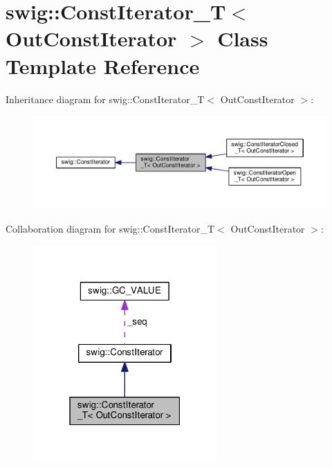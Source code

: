 \hypertarget{classswig_1_1ConstIterator__T}{}\section{swig\+:\+:Const\+Iterator\+\_\+T$<$ Out\+Const\+Iterator $>$ Class Template Reference}
\label{classswig_1_1ConstIterator__T}


Inheritance diagram for swig\+:\+:Const\+Iterator\+\_\+T$<$ Out\+Const\+Iterator $>$\+:
\nopagebreak
\begin{figure}[H]
\begin{center}
\leavevmode
\includegraphics[width=350pt]{classswig_1_1ConstIterator__T__inherit__graph}
\end{center}
\end{figure}


Collaboration diagram for swig\+:\+:Const\+Iterator\+\_\+T$<$ Out\+Const\+Iterator $>$\+:
\nopagebreak
\begin{figure}[H]
\begin{center}
\leavevmode
\includegraphics[width=199pt]{classswig_1_1ConstIterator__T__coll__graph}
\end{center}
\end{figure}

